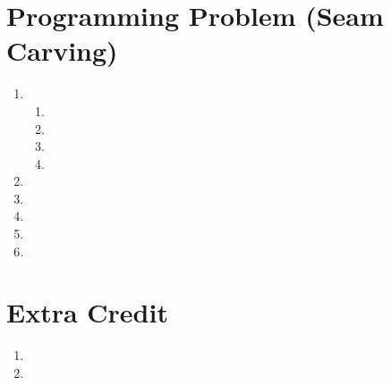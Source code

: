 \documentclass{article}
\begin{document}
\label{Programming Problem (Seam Carving)}
\section{Programming Problem (Seam Carving)}
\begin{enumerate}
	\item
	\begin{enumerate}
		\item
		\item
		\item
		\item 
	\end{enumerate}
	\item
	\item
	\item
	\item
	\item 
\end{enumerate}
\pagebreak

\label{Extra Credit}
\section{Extra Credit}
\begin{enumerate}
	\item
	\item 
\end{enumerate}
\end{document}
